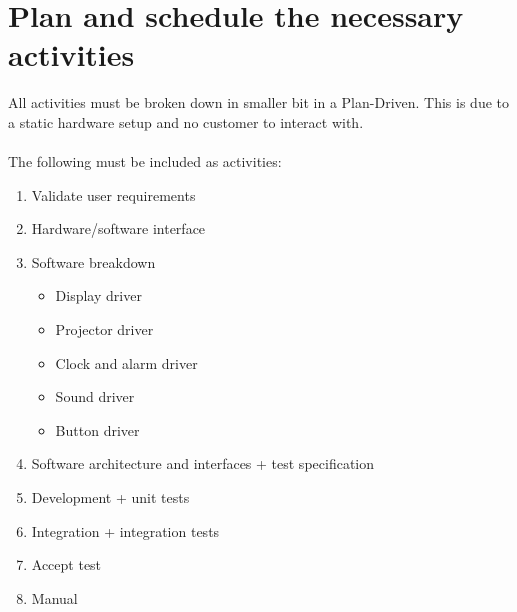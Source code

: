 \documentclass[Main]{subfiles}
\begin{document}
\section{Plan and schedule the necessary activities} 


All activities must be broken down in smaller bit in a Plan-Driven.
This is due to a static hardware setup and no customer to interact with.
\\
\\
The following must be included as activities:
\begin{enumerate}
	\item Validate user requirements
	\item Hardware/software interface
	\item Software breakdown
	\begin{itemize}
		\item Display driver
		\item Projector driver
		\item Clock and alarm driver
		\item Sound driver
		\item Button driver
	\end{itemize}
	\item Software architecture and interfaces + test specification
	\item Development + unit tests
	\item Integration + integration tests
	\item Accept test
	\item Manual
\end{enumerate}
\end{document}
